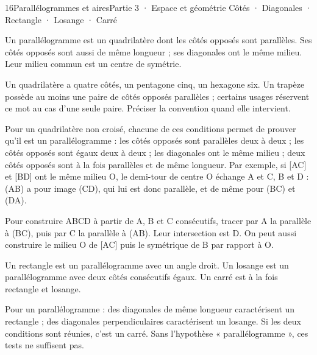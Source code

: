 \begin{ouverture}[geometrie]{16}{Parallélogrammes et aires}{Partie 3 · Espace et géométrie}
{Côtés · Diagonales · Rectangle · Losange · Carré}
\end{ouverture}
\pagestyle{otMain}\essentiel\fontsize{11}{15}\selectfont
{}\label{cours-16-1}
\begin{definition}Un parallélogramme est un quadrilatère dont les côtés opposés sont parallèles. Ses côtés opposés sont aussi de même longueur ; ses diagonales ont le même milieu. Leur milieu commun est un centre de symétrie.\end{definition}
\begin{definition}Un quadrilatère a quatre côtés, un pentagone cinq, un hexagone six. Un trapèze possède au moins une paire de côtés opposés parallèles ; certains usages réservent ce mot au cas d’une seule paire. Préciser la convention quand elle intervient.\end{definition}
\label{fig-cours-16-1-cours-parallelogramme}

\begin{propriete}Pour un quadrilatère non croisé, chacune de ces conditions permet de prouver qu’il est un parallélogramme : les côtés opposés sont parallèles deux à deux ; les côtés opposés sont égaux deux à deux ; les diagonales ont le même milieu ; deux côtés opposés sont à la fois parallèles et de même longueur. Par exemple, si [AC] et [BD] ont le même milieu O, le demi-tour de centre O échange A et C, B et D : (AB) a pour image (CD), qui lui est donc parallèle, et de même pour (BC) et (DA).\end{propriete}
\begin{savoirfaire}Pour construire ABCD à partir de A, B et C consécutifs, tracer par A la parallèle à (BC), puis par C la parallèle à (AB). Leur intersection est D. On peut aussi construire le milieu O de [AC] puis le symétrique de B par rapport à O.\end{savoirfaire}
\clearpage
{}\label{cours-16-2}
\begin{definition}Un rectangle est un parallélogramme avec un angle droit. Un losange est un parallélogramme avec deux côtés consécutifs égaux. Un carré est à la fois rectangle et losange.\end{definition}
\begin{propriete}Pour un parallélogramme : des diagonales de même longueur caractérisent un rectangle ; des diagonales perpendiculaires caractérisent un losange. Si les deux conditions sont réunies, c’est un carré. Sans l’hypothèse « parallélogramme », ces tests ne suffisent pas.\end{propriete}
\label{fig-cours-16-2-cours-aire-parallelogramme}

